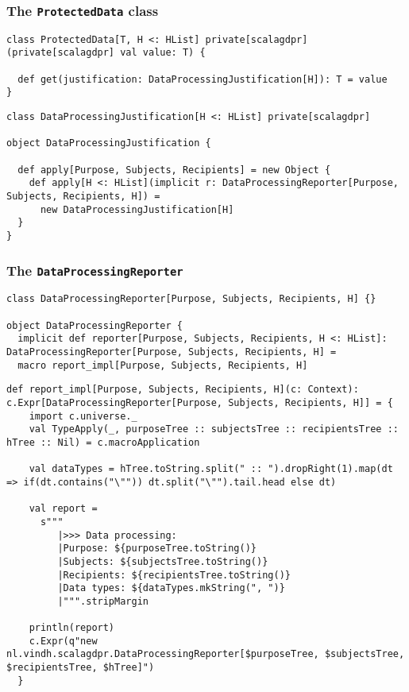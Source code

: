 \documentclass[aspectratio=169]{beamer}
\begin{document}
\begin{frame}[fragile]
\frametitle{The \texttt{ProtectedData} class}

\begin{lstlisting}[style=myScalastyle,frame=none]
class ProtectedData[T, H <: HList] private[scalagdpr](private[scalagdpr] val value: T) {

  def get(justification: DataProcessingJustification[H]): T = value
}
\end{lstlisting}
\pause
\begin{lstlisting}[style=myScalastyle,frame=none]
class DataProcessingJustification[H <: HList] private[scalagdpr]

object DataProcessingJustification {

  def apply[Purpose, Subjects, Recipients] = new Object {
    def apply[H <: HList](implicit r: DataProcessingReporter[Purpose, Subjects, Recipients, H]) =
      new DataProcessingJustification[H]
  }
}
\end{lstlisting}

\end{frame}

\begin{frame}[fragile]
\frametitle{The \texttt{DataProcessingReporter}}

\begin{lstlisting}[style=myScalastyle,frame=none]
class DataProcessingReporter[Purpose, Subjects, Recipients, H] {}

object DataProcessingReporter {
  implicit def reporter[Purpose, Subjects, Recipients, H <: HList]: DataProcessingReporter[Purpose, Subjects, Recipients, H] =
  macro report_impl[Purpose, Subjects, Recipients, H]
\end{lstlisting}
\pause
\begin{lstlisting}[style=myScalastyle,frame=none]
  def report_impl[Purpose, Subjects, Recipients, H](c: Context): c.Expr[DataProcessingReporter[Purpose, Subjects, Recipients, H]] = {
    import c.universe._
    val TypeApply(_, purposeTree :: subjectsTree :: recipientsTree :: hTree :: Nil) = c.macroApplication

    val dataTypes = hTree.toString.split(" :: ").dropRight(1).map(dt => if(dt.contains("\"")) dt.split("\"").tail.head else dt)

    val report =
      s"""
         |>>> Data processing:
         |Purpose: ${purposeTree.toString()}
         |Subjects: ${subjectsTree.toString()}
         |Recipients: ${recipientsTree.toString()}
         |Data types: ${dataTypes.mkString(", ")}
         |""".stripMargin

    println(report)
    c.Expr(q"new nl.vindh.scalagdpr.DataProcessingReporter[$purposeTree, $subjectsTree, $recipientsTree, $hTree]")
  }
\end{lstlisting}

\end{frame}
\end{document}

